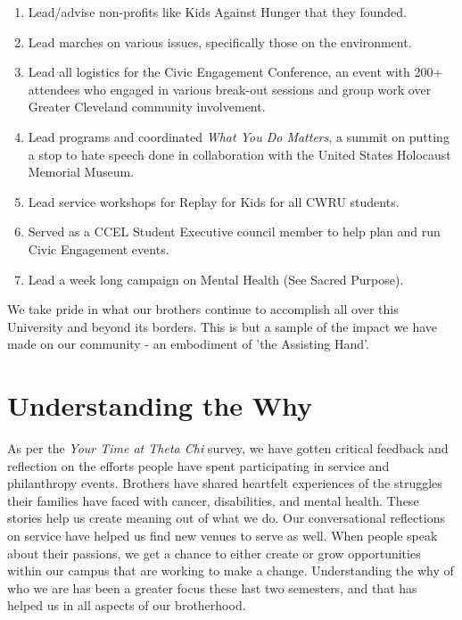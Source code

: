       \begin{enumerate}
      	\item Lead/advise non-profits like Kids Against Hunger that they founded.
      	
      	\item Lead marches on various issues, specifically those on the environment.
      	
      	\item Lead all logistics for the Civic Engagement Conference, an event with 200+ attendees who engaged in various break-out sessions and group work over Greater Cleveland community involvement.
      	
      	\item Lead programs and coordinated  \textit{What You Do Matters}, a summit on putting a stop to hate speech done in collaboration with the United States Holocaust Memorial Museum.
      	
      	\item Lead service workshops for Replay for Kids for all CWRU students.
      	
      	\item Served as a CCEL Student Executive council member to help plan and run Civic Engagement events.
      	
      	\item Lead a week long campaign on Mental Health (See Sacred Purpose).
      \end{enumerate}
      
      We take pride in what our brothers continue to accomplish all over this University and beyond its borders. This is but a sample of the impact we have made on our community - an embodiment of 'the Assisting Hand'.

    \section*{Understanding the Why}
      As per the \textit{Your Time at Theta Chi} survey, we have gotten critical feedback and reflection on the efforts people have spent participating in service and philanthropy events. Brothers have shared heartfelt experiences of the struggles their families have faced with cancer, disabilities, and mental health. These stories help us create meaning out of what we do. Our conversational reflections on service have helped us find new venues to serve as well. When people speak about their passions, we get a chance to either create or grow opportunities within our campus that are working to make a change. Understanding the why of who we are has been a greater focus these last two semesters, and that has helped us in all aspects of our brotherhood.
